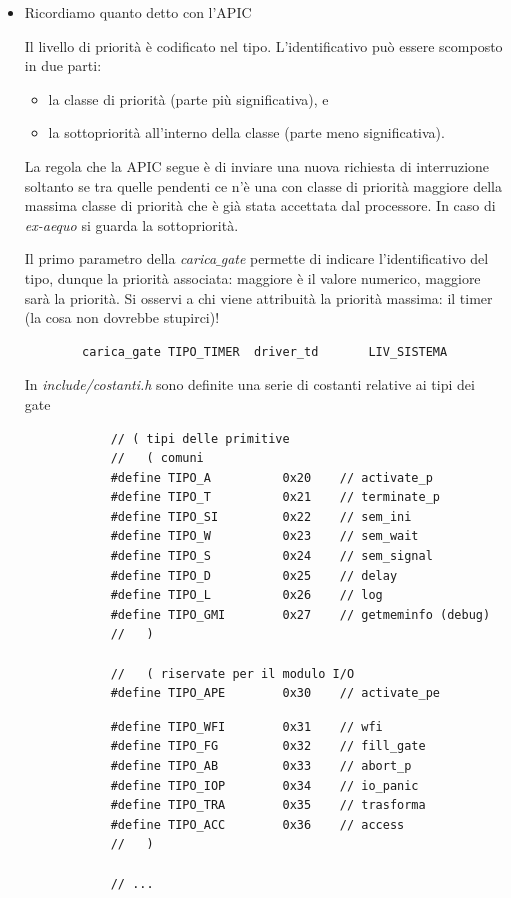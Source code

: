 \begin{itemize}
	\item Ricordiamo quanto detto con l'APIC
	\small
	\begin{framed}
		\noindent Il livello di priorità è codificato nel tipo. L'identificativo può essere scomposto in due parti:
		\begin{itemize}
			\item la classe di priorità (parte più significativa), e 
			\item la sottopriorità all'interno della classe (parte meno significativa).
		\end{itemize}
		La regola che la APIC segue è di inviare una nuova richiesta di interruzione soltanto se tra quelle pendenti ce n'è una con classe di priorità maggiore della massima classe di priorità che è già stata accettata dal processore. In caso di \emph{ex-aequo} si guarda la sottopriorità.
	\end{framed}
	\normalsize Il primo parametro della \emph{carica$\_$gate} permette di indicare l'identificativo del tipo, dunque la priorità associata: maggiore è il valore numerico, maggiore sarà la priorità. Si osservi a chi viene attribuità la priorità massima: il timer (la cosa non dovrebbe stupirci)!
	\begin{verbatim}
		carica_gate TIPO_TIMER  driver_td       LIV_SISTEMA
	\end{verbatim}
	In \emph{include/costanti.h} sono definite una serie di costanti relative ai tipi dei gate
	\small
	\begin{multicols}{2}
		\begin{verbatim}
			// ( tipi delle primitive
			//   ( comuni
			#define TIPO_A			0x20	// activate_p
			#define TIPO_T			0x21	// terminate_p
			#define TIPO_SI			0x22	// sem_ini
			#define TIPO_W			0x23	// sem_wait
			#define TIPO_S			0x24	// sem_signal
			#define TIPO_D			0x25	// delay
			#define TIPO_L			0x26	// log
			#define TIPO_GMI		0x27	// getmeminfo (debug)
			//   )
			
			//   ( riservate per il modulo I/O
			#define TIPO_APE		0x30	// activate_pe
		\end{verbatim}
		\columnbreak 
		\begin{verbatim}
			#define TIPO_WFI		0x31	// wfi
			#define TIPO_FG			0x32	// fill_gate
			#define TIPO_AB			0x33	// abort_p
			#define TIPO_IOP		0x34	// io_panic
			#define TIPO_TRA		0x35	// trasforma
			#define TIPO_ACC		0x36	// access
			//   )
			
			// ...
			

\end{verbatim}
\end{multicols}
\end{itemize}

